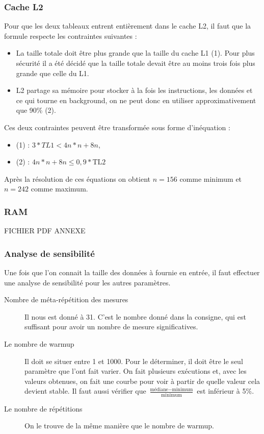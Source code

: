 \documentclass[12pt,a4paper]{article}
\begin{document}
\subsubsection{Cache L2}
Pour que les deux tableaux entrent entièrement dans le cache L2, il faut 
que la formule respecte les contraintes suivantes : 
\begin{itemize}
    \item La taille totale doit être plus grande que la taille du cache 
    L1 (1). Pour plus sécurité il a été décidé que la taille totale devait 
    être au moins trois fois plus grande que celle du L1.
    \item L2 partage sa mémoire pour stocker à la fois les instructions, 
    les données et ce qui tourne en background, on ne peut donc en utiliser 
    approximativement que 90\% (2). 
\end{itemize}

Ces deux contraintes peuvent être transformée sous forme d'inéquation :
\begin{itemize}
    \item (1) : $3*TL1 < 4n*n + 8n$,
    \item (2) : $4n*n + 8n \le 0,9*\text{TL2}$
\end{itemize}
Après la résolution de ces équations on obtient $n=156$ comme minimum et $n=242$
comme maximum.

\subsubsection{RAM}

FICHIER PDF ANNEXE

\subsubsection{Analyse de sensibilité}

Une fois que l'on connait la taille des données à fournie en entrée, 
il faut effectuer une analyse de sensibilité pour les autres paramètres. 
\begin{description}
    \item[Nombre de méta-répétition des mesures] Il nous est donné à 31. C'est
        le nombre donné dans la consigne, qui est suffisant pour avoir un nombre
        de mesure significatives.
    \item[Le nombre de warmup] Il doit se situer entre 1 et 1000. Pour le
        déterminer, il doit être le seul paramètre que l'ont fait varier. On
        fait plusieurs exécutions et, avec les valeurs obtenues, on fait une
        courbe pour voir à partir de quelle valeur cela devient stable. Il faut
        aussi vérifier que
        $\frac{\text{médiane}-\text{minimum}}{\text{minimum}}$ est inférieur à
        5\%. 
    \item[Le nombre de répétitions] On le trouve de la même manière que le
        nombre de warmup.
\end{description}
\end{document}
